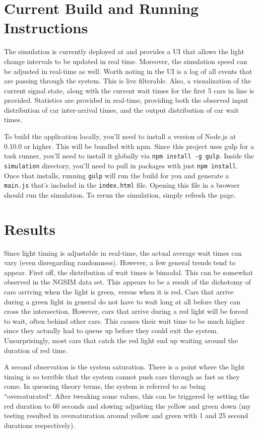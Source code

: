 \documentclass[a4paper,12pt]{article}
\begin{document}
\section{Current Build and Running Instructions}
The simulation is currently deployed at \cite{aprilandchip} and provides a UI that allows the light change intervals to
be updated in real time. Moreover, the simulation speed can be adjusted in real-time as well. Worth noting in the UI is
a log of all events that are passing through the system. This is live filterable. Also, a visualization of the current
signal state, along with the current wait times for the first 5 cars in line is provided. Statistics are provided in
real-time, providing both the observed input distribution of car inter-arrival times, and the output distribution of
car wait times.

To build the application locally, you'll need to install a version of Node.js \cite{nodejs} at 0.10.0 or higher. This will be bundled
with npm. Since this project uses gulp for a task runner, you'll need to install it globally via
\texttt{npm install -g gulp}. Inside the \texttt{simulation} directory, you'll need to pull in packages with just
\texttt{npm install}. Once that installs, running \texttt{gulp} will run the build for you and generate a
\texttt{main.js} that's included in the \texttt{index.html} file. Opening this file in a browser should run the
simulation. To rerun the simulation, simply refresh the page.

\section{Results}
Since light timing is adjustable in real-time, the actual average wait times can vary (even disregarding randomness).
However, a few general trends tend to appear. First off, the distribution of wait times is bimodal. This can be
somewhat observed in the NGSIM data set. This appears to be a result of the dichotomy of cars arriving when the light
is green, versus when it is red. Cars that arrive during a green light in general do not have to wait long at all
before they can cross the intersection. However, cars that arrive during a red light will be forced to wait, often
behind other cars. This causes their wait time to be much higher since they actually had to queue up before they could
exit the system. Unsurprisingly, most cars that catch the red light end up waiting around the duration of red time.

A second observation is the system saturation. There is a point where the light timing is so terrible that the system
cannot push cars through as fast as they come. In queueing theory terms, the system is referred to as being
``oversaturated``. After tweaking some values, this can be triggered by setting the red duration to 60 seconds and
slowing adjusting the yellow and green down (my testing resulted in oversaturation around yellow and green with 1 and
25 second durations respectively).
\end{document}
